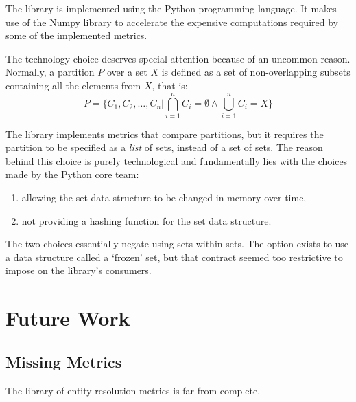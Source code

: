 \documentclass[11pt]{article}
\begin{document}
    The library is implemented using the Python programming language\cite{python}.
    It makes use of the Numpy library\cite{harris2020numpy} to accelerate
    the expensive computations required by some of the implemented metrics.

    The technology choice deserves special attention because of an uncommon
    reason.
    Normally, a partition $P$ over a set $X$ is defined as a set of
    non-overlapping subsets containing all the elements from $X$, that is:
    \[
        P = \{ C_1, C_2, \ldots, C_n | \bigcap\limits^n_{i=1}C_i=\emptyset \land \bigcup\limits^n_{i=1}C_i=X \}
    \]

    The library implements metrics that compare partitions, but it requires the
    partition to be specified as a \textit{list} of sets, instead of a set of
    sets.
    The reason behind this choice is purely technological and fundamentally lies
    with the choices made by the Python core team:
    \begin{enumerate}
        \item allowing the set data structure to be changed in memory over time,
        \item not providing a hashing function for the set data structure.
    \end{enumerate}

    The two choices essentially negate using sets within sets.
    The option exists to use a data structure called a `frozen' set, but that
    contract seemed too restrictive to impose on the library's consumers.

    \section{Future Work}\label{sec:conclusions}

    \subsection{Missing Metrics}

    The library of entity resolution metrics is far from complete.


    
\end{document}
